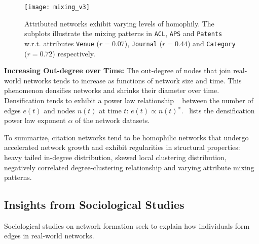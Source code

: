 
\begin{figure}
 \centering
 \texttt{[image: mixing\_v3]}
 \caption{
    Attributed networks exhibit varying levels of homophily. The subplots
    illustrate the mixing patterns in \texttt{ACL}, \texttt{APS} and \texttt{Patents}
    w.r.t. attributes \texttt{Venue} ($r=0.07$), \texttt{Journal} ($r=0.44$) and
    \texttt{Category} ($r=0.72$) respectively.
 }
 \label{fig:mixing}
 \vspace{-15pt}
\end{figure}

\textbf{Increasing Out-degree over Time:}
The out-degree of nodes that join real-world networks tends to increase
as functions of network size and time. This phenomenon densifies networks and shrinks their
diameter over time. Densification tends to exhibit a power law relationship
~\cite{leskovec2005graphs} between the number of edges $e(t)$ and nodes $n(t)$ at time $t$: $e(t) \propto n(t)^{\alpha}$.~ lists the densification power law exponent $\alpha$ of the network datasets.

To summarize, citation networks tend to be homophilic networks that undergo
accelerated network growth and exhibit regularities in structural properties:
heavy tailed in-degree distribution, skewed local clustering distribution,
negatively correlated degree-clustering relationship and varying attribute
mixing patterns.



\subsection{Insights from Sociological Studies}

Sociological studies on network formation seek to explain
how individuals form edges in real-world networks.

